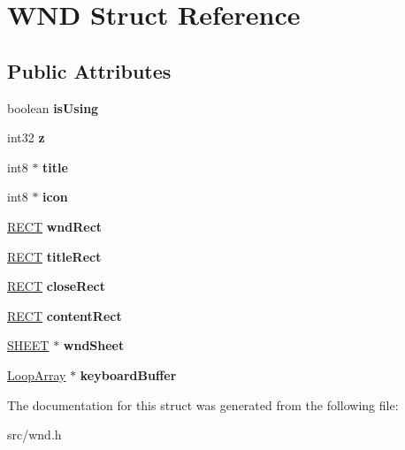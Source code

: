 \hypertarget{struct_w_n_d}{}\section{W\+N\+D Struct Reference}
\label{struct_w_n_d}
\subsection*{Public Attributes}
\begin{DoxyCompactItemize}
\item 
\hypertarget{struct_w_n_d_add4681de04b08c581dc2e57f76792643}{}boolean {\bfseries is\+Using}\label{struct_w_n_d_add4681de04b08c581dc2e57f76792643}

\item 
\hypertarget{struct_w_n_d_ab5264ccfea88de8e902044b64f2babd8}{}int32 {\bfseries z}\label{struct_w_n_d_ab5264ccfea88de8e902044b64f2babd8}

\item 
\hypertarget{struct_w_n_d_a1a8c36053a2fe883b6882d236bd5d4aa}{}int8 $\ast$ {\bfseries title}\label{struct_w_n_d_a1a8c36053a2fe883b6882d236bd5d4aa}

\item 
\hypertarget{struct_w_n_d_a2309c1bf0c0244b17a8f67ac1f3ec029}{}int8 $\ast$ {\bfseries icon}\label{struct_w_n_d_a2309c1bf0c0244b17a8f67ac1f3ec029}

\item 
\hypertarget{struct_w_n_d_a54cb0e6d0af5285749ec3511c790c46d}{}\hyperlink{struct_r_e_c_t}{R\+E\+C\+T} {\bfseries wnd\+Rect}\label{struct_w_n_d_a54cb0e6d0af5285749ec3511c790c46d}

\item 
\hypertarget{struct_w_n_d_a8a084e7dfa553d12ae07c718f0328dec}{}\hyperlink{struct_r_e_c_t}{R\+E\+C\+T} {\bfseries title\+Rect}\label{struct_w_n_d_a8a084e7dfa553d12ae07c718f0328dec}

\item 
\hypertarget{struct_w_n_d_a92ba50fd054a869e7a4cc33f52fbb60e}{}\hyperlink{struct_r_e_c_t}{R\+E\+C\+T} {\bfseries close\+Rect}\label{struct_w_n_d_a92ba50fd054a869e7a4cc33f52fbb60e}

\item 
\hypertarget{struct_w_n_d_aba8a64f2dfcb58d15528fc3ebb871fe3}{}\hyperlink{struct_r_e_c_t}{R\+E\+C\+T} {\bfseries content\+Rect}\label{struct_w_n_d_aba8a64f2dfcb58d15528fc3ebb871fe3}

\item 
\hypertarget{struct_w_n_d_a5f56c9379f2387ba2ad635919ceef690}{}\hyperlink{struct_s_h_e_e_t}{S\+H\+E\+E\+T} $\ast$ {\bfseries wnd\+Sheet}\label{struct_w_n_d_a5f56c9379f2387ba2ad635919ceef690}

\item 
\hypertarget{struct_w_n_d_a2d2705440c3a90d3fe969ab00218a640}{}\hyperlink{struct_loop_array}{Loop\+Array} $\ast$ {\bfseries keyboard\+Buffer}\label{struct_w_n_d_a2d2705440c3a90d3fe969ab00218a640}

\end{DoxyCompactItemize}


The documentation for this struct was generated from the following file\+:\begin{DoxyCompactItemize}
\item 
src/wnd.\+h\end{DoxyCompactItemize}
